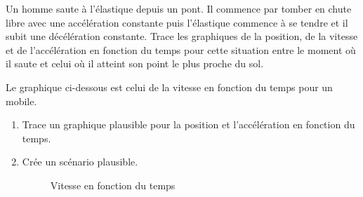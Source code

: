 \begin{exercise}
  Un homme saute à l'élastique depuis un pont. Il commence par tomber en chute libre avec une accélération constante puis l'élastique commence à se tendre et il subit une décélération constante. Trace les graphiques de la position, de la vitesse et de l'accélération en fonction du temps pour cette situation entre le moment où il saute et celui où il atteint son point le plus proche du sol.
\end{exercise}

\begin{exercise}
  Le graphique ci-dessous est celui de la vitesse en fonction du temps pour un mobile.
  \begin{enumerate}[label=\alph*)]
    \item Trace un graphique plausible pour la position et l'accélération en fonction du temps.
    \item Crée un scénario plausible.
          \begin{figure}[h!]
            \centering
            \caption{Vitesse en fonction du temps}
            \label{Vitesse en fonction du temps}
          \end{figure}
  \end{enumerate}
\end{exercise}


